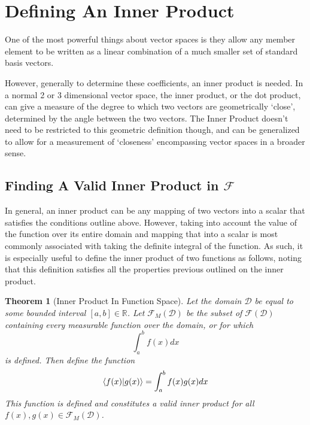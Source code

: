 \documentclass{article}
\newcommand*\R{\mathbb{R}}
\newtheorem{theorem}{Theorem}[section]
\theoremstyle{definition}
\theoremstyle{remark}
\begin{document}
\section{Defining An Inner Product}
One of the most powerful things about vector spaces is they allow any member element to 
be written as a linear combination of a much smaller set of standard basis vectors.

However, generally to determine these coefficients, an inner product is needed.
In a normal 2 or 3 dimensional vector space, the inner product, or the dot product,
can give a measure of the degree to which two vectors are geometrically `close',
determined by the angle between the two vectors. The Inner Product doesn't need
to be restricted to this geometric definition though, and can be generalized
to allow for a measurement of `closeness' encompassing vector spaces in a broader sense.



\subsection{Finding A Valid Inner Product in $\mathscr{F}$}

In general, an inner product can be any mapping of two vectors into a scalar that satisfies the conditions outline above.
However, taking into account the value of the function over its entire 
domain and mapping that into a scalar is most commonly associated with 
taking the definite integral of the function. As such, it is especially useful
to define the inner product of two functions as follows, noting that
this definition satisfies all the properties previous outlined on the 
inner product. 

\begin{theorem}[Inner Product In Function Space]
  Let the domain $\mathcal{D}$ be equal to some bounded interval $[a, b] \in \R$.
  Let $\mathscr{F}_M(\mathcal{D})$ be the subset of $\mathscr{F}(\mathcal{D})$ containing every 
  measurable function over the domain, or for which 
  $$ \int_a^b f(x) dx $$ is defined. Then define the function 
  \begin{equation}
    \braket{f(x)| g(x)} = \int_a^b f(x) g(x) dx
    \label{eq:standardIP}
  \end{equation}
  This function is defined and constitutes a valid inner product for all $f(x), g(x) \in \mathscr{F}_M(\mathcal{D})$.
\end{theorem}

\end{document}
